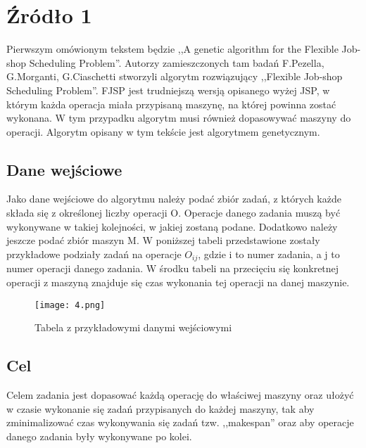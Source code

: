 \documentclass{article}
\begin{document}
\section{Źródło 1}
Pierwszym omówionym tekstem będzie ,,A genetic algorithm for the Flexible Job-shop Scheduling Problem''.
Autorzy zamieszczonych tam badań F.Pezella, G.Morganti, G.Ciaschetti stworzyli algorytm rozwiązujący ,,Flexible Job-shop Scheduling Problem''. FJSP jest trudniejszą wersją opisanego wyżej JSP, w którym każda operacja miała przypisaną maszynę, na której powinna zostać wykonana. W tym przypadku algorytm musi również dopasowywać maszyny do operacji. Algorytm opisany w tym tekście jest algorytmem genetycznym.

 \subsection{Dane wejściowe}
 Jako dane wejściowe do algorytmu należy podać zbiór zadań, z których każde składa się z określonej liczby operacji O. Operacje danego zadania muszą być wykonywane w takiej kolejności, w jakiej zostaną podane. Dodatkowo należy jeszcze podać zbiór maszyn M. W poniższej tabeli przedstawione zostały przykładowe podziały zadań na operacje $O_{ij}$, gdzie i to numer zadania, a j to numer operacji danego zadania. W środku tabeli na przecięciu się konkretnej operacji z maszyną znajduje się czas wykonania tej operacji na danej maszynie.
 \begin{figure}[H]
 \centering
 \texttt{[image: 4.png]}
 \caption{Tabela z przykładowymi danymi wejściowymi}
 \end{figure}

 \subsection{Cel}
 Celem zadania jest dopasować każdą operację do właściwej maszyny oraz ułożyć w czasie wykonanie się zadań przypisanych do każdej maszyny, tak aby zminimalizować czas wykonywania się zadań tzw. ,,makespan'' oraz aby operacje danego zadania były wykonywane po kolei.
\end{document}

